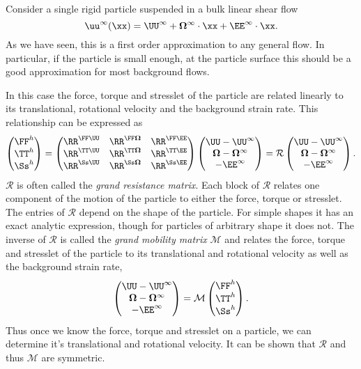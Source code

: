 Consider a single rigid particle suspended in a bulk linear shear flow
\[ \uu^\infty(\xx) = \UU^\infty + \bf{\Omega}^\infty\cdot\xx + \EE^\infty\cdot\xx.\]
As we have seen, this is a first order approximation to any general flow. In particular, if the particle is small enough, at the particle surface this should be a good approximation for most background flows.

In this case the force, torque and stresslet of the particle are related linearly to its translational, rotational velocity and the background strain rate. This relationship can be expressed as
\[ \begin{pmatrix} \FF^h\\ \TT^h\\ \Ss^h\end{pmatrix} = \begin{pmatrix} \RR^{\FF\UU} & \RR^{\FF\bf{\Omega}} & \RR^{\FF\EE}\\
														\RR^{\TT\UU} & \RR^{\TT\bf{\Omega}} & \RR^{\TT\EE}\\
														\RR^{\Ss\UU} & \RR^{\Ss\bf{\Omega}} & \RR^{\Ss\EE}\end{pmatrix}
										\begin{pmatrix} \UU - \UU^\infty\\ \bf{\Omega} - \bf{\Omega}^\infty\\ -\EE^\infty\end{pmatrix} = \mathcal{R\begin{pmatrix} \UU - \UU^\infty\\ \bf{\Omega} - \bf{\Omega}^\infty\\ -\EE^\infty\end{pmatrix} .}\]
$\mathcal{R}$ is often called the \emph{grand resistance matrix}. Each block of $\mathcal{R}$ relates one component of the motion of the particle to either the force, torque or stresslet. The entries of $\mathcal{R}$ depend on the shape of the particle. For simple shapes it has an exact analytic expression, though for particles of arbitrary shape it does not. The inverse of $\mathcal{R}$ is called the \emph{grand mobility matrix} $\mathcal{M}$ and relates the force, torque and stresslet of the particle to its translational and rotational velocity as well as the background strain rate,
\[ \begin{pmatrix} \UU - \UU^\infty\\ \bf{\Omega} - \bf{\Omega}^\infty\\ -\EE^\infty\end{pmatrix}  = \mathcal{M}\begin{pmatrix} \FF^h\\ \TT^h\\ \Ss^h\end{pmatrix} .\]
Thus once we know the force, torque and stresslet on a particle, we can determine it's translational and rotational velocity. It can be shown that $\mathcal{R}$ and thus $\mathcal{M}$ are symmetric. 

